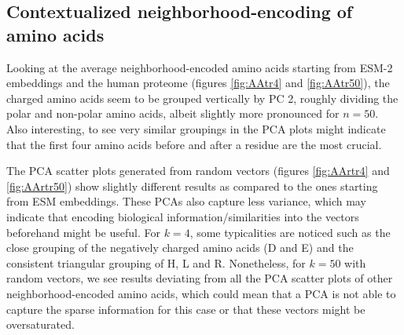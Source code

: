 \subsection{Contextualized neighborhood-encoding of amino acids}
Looking at the average neighborhood-encoded amino acids starting from ESM-2 embeddings and the human proteome (figures \ref{fig:AAtr4} and \ref{fig:AAtr50}), the charged amino acids seem to be grouped vertically by PC 2, roughly dividing the polar and non-polar amino acids, albeit slightly more pronounced for $n = 50$. Also interesting, to see very similar groupings in the PCA plots might indicate that the first four amino acids before and after a residue are the most crucial.

The PCA scatter plots generated from random vectors (figures \ref{fig:AArtr4} and \ref{fig:AArtr50}) show slightly different results as compared to the ones starting from ESM embeddings. These PCAs also capture less variance, which may indicate that encoding biological information/similarities into the vectors beforehand might be useful. For $k = 4$, some typicalities are noticed such as the close grouping of the negatively charged amino acids (D and E) and the consistent triangular grouping of H, L and R. Nonetheless, for $k = 50$ with random vectors, we see results deviating from all the PCA scatter plots of other neighborhood-encoded amino acids, which could mean that a PCA is not able to capture the sparse information for this case or that these vectors might be oversaturated.

